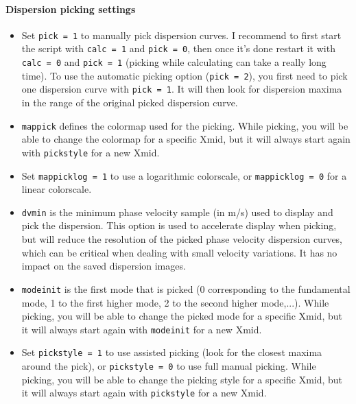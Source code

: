 \documentclass[twoside,a4paper]{article}
\begin{document}
\paragraph{Dispersion picking settings}
\begin{itemize}
\setlength\itemsep{2ex}
\setlength{\parindent}{5ex}

\item Set \verb|pick = 1| to manually pick dispersion curves. I recommend to first start the script with \verb|calc = 1| and \verb|pick = 0|, then once it's done restart it with \verb|calc = 0| and \verb|pick = 1| (picking while calculating can take a really long time). To use the automatic picking option (\verb|pick = 2|), you first need to pick one dispersion curve with \verb|pick = 1|. It will then look for dispersion maxima in the range of the original picked dispersion curve.

\item \verb|mappick| defines the colormap used for the picking. While picking, you will be able to change the colormap for a specific Xmid, but it will always start again with \verb|pickstyle| for a new Xmid.

\item Set \verb|mappicklog = 1| to use a logarithmic colorscale, or \verb|mappicklog = 0| for a linear colorscale.

\item \verb|dvmin| is the minimum phase velocity sample (in m/s) used to display and pick the dispersion. This option is used to accelerate display when picking, but will reduce the resolution of the picked phase velocity dispersion curves, which can be critical when dealing with small velocity variations. It has no impact on the saved dispersion images.

\item \verb|modeinit| is the first mode that is picked (0 corresponding to the fundamental mode, 1 to the first higher mode, 2 to the second higher mode,...). While picking, you will be able to change the picked mode for a specific Xmid, but it will always start again with \verb|modeinit| for a new Xmid.

\item Set \verb|pickstyle = 1| to use assisted picking (look for the closest maxima around the pick), or \verb|pickstyle = 0| to use full manual picking. While picking, you will be able to change the picking style for a specific Xmid, but it will always start again with \verb|pickstyle| for a new Xmid.


\end{itemize}
\end{document}
